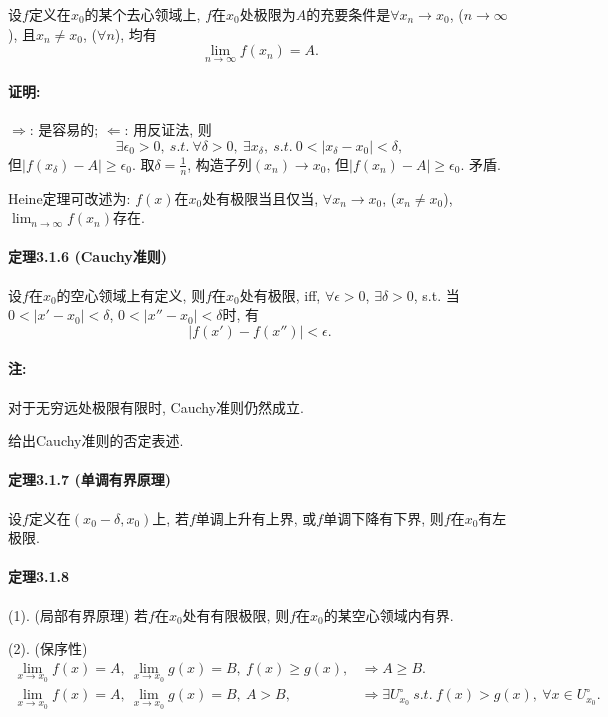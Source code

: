 设$f$定义在$x_{0}$的某个去心领域上, $f$在$x_{0}$处极限为$A$的充要条件是$\forall x_{n}\to x_{0}$,
($n\to\infty$), 且$x_{n}\ne x_{0}$, ($\forall n$), 均有
\[
\lim_{n\to\infty}f(x_{n})=A.
\]


\paragraph{证明:}

$\Longrightarrow$: 是容易的; $\Longleftarrow$: 用反证法, 则
\[
\exists\epsilon_{0}>0,\ s.t.\ \forall\delta>0,\ \exists x_{\delta},\ s.t.\ 0<\left|x_{\delta}-x_{0}\right|<\delta,
\]
但$\left|f(x_{\delta})-A\right|\ge\epsilon_{0}$. 取$\delta=\frac{1}{n}$,
构造子列$(x_{n})\to x_{0}$, 但$\left|f(x_{n})-A\right|\ge\epsilon_{0}$.
矛盾.

Heine定理可改述为: $f(x)$在$x_{0}$处有极限当且仅当, $\forall x_{n}\to x_{0}$,
($x_{n}\ne x_{0}$), $\lim_{n\to\infty}f(x_{n})$存在.

\paragraph{定理3.1.6 (Cauchy准则)}

设$f$在$x_{0}$的空心领域上有定义, 则$f$在$x_{0}$处有极限, iff, $\forall\epsilon>0$,
$\exists\delta>0$, s.t. 当$0<\left|x'-x_{0}\right|<\delta$, $0<\left|x''-x_{0}\right|<\delta$时,
有
\[
\left|f(x')-f(x'')\right|<\epsilon.
\]


\paragraph{注:}

对于无穷远处极限有限时, Cauchy准则仍然成立.

给出Cauchy准则的否定表述.

\paragraph{定理3.1.7 (单调有界原理)}

设$f$定义在$(x_{0}-\delta,x_{0})$上, 若$f$单调上升有上界, 或$f$单调下降有下界, 则$f$在$x_{0}$有左极限.

\paragraph{定理3.1.8}

(1). (局部有界原理) 若$f$在$x_{0}$处有有限极限, 则$f$在$x_{0}$的某空心领域内有界.

(2). (保序性) 
\begin{align*}
\lim_{x\to x_{0}}f(x)=A,\ \lim_{x\to x_{0}}g(x)=B,\ f(x)\ge g(x), & \Longrightarrow A\ge B.\\
\lim_{x\to x_{0}}f(x)=A,\ \lim_{x\to x_{0}}g(x)=B,\ A>B, & \Longrightarrow\exists U_{x_{0}}^{\circ}\ s.t.\ f(x)>g(x),\ \forall x\in U_{x_{0}}^{\circ}.
\end{align*}

